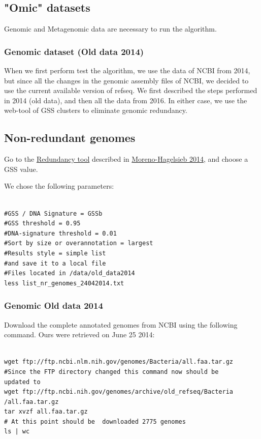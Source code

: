 \documentclass[a4paper,11pt]{report}
\begin{document}
\subsection {"Omic" datasets} 

Genomic and Metagenomic data are necessary to run the algorithm.  

\subsubsection{Genomic dataset (Old data 2014)}

When we first perform test the algorithm, we use the data of NCBI from 2014, but since all the changes in the genomic assembly files of NCBI, we decided to use the current available version of refseq. We first described the steps performed in 2014 (old data), and then all the data from 2016. In either case, we use the web-tool of GSS clusters to eliminate genomic redundancy. 

\subsection{Non-redundant genomes}

Go to the \href{http://microbiome.wlu.ca/research/redundancy/redundancy.cgi}{Redundancy tool}  described in \href{http://bioinformatics.oxfordjournals.org/content/early/2013/02/27/bioinformatics.btt064.full}{Moreno-Hagelsieb 2014}, and choose a GSS value.

We chose the following parameters:
\begin{verbatim}

#GSS / DNA Signature = GSSb
#GSS threshold = 0.95
#DNA-signature threshold = 0.01
#Sort by size or overannotation = largest
#Results style = simple list
#and save it to a local file 
#Files located in /data/old_data2014
less list_nr_genomes_24042014.txt  

\end{verbatim}

\subsubsection{Genomic Old data 2014}
Download the complete  annotated genomes from NCBI using the following command. Ours were retrieved on June 25 2014:  

\begin{verbatim}

wget ftp://ftp.ncbi.nlm.nih.gov/genomes/Bacteria/all.faa.tar.gz
#Since the FTP directory changed this command now should be 
updated to
wget ftp://ftp.ncbi.nih.gov/genomes/archive/old_refseq/Bacteria
/all.faa.tar.gz
tar xvzf all.faa.tar.gz
# At this point should be  downloaded 2775 genomes
ls | wc 
\end{verbatim}
\end{document}
